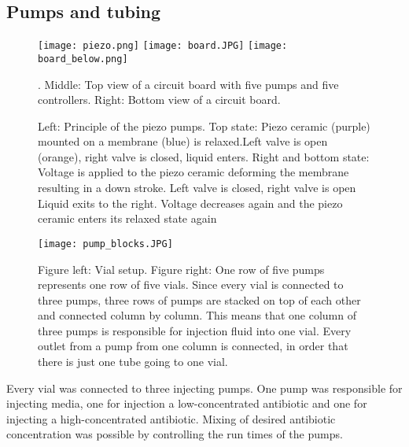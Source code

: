 \subsection{Pumps and tubing} 
\begin{figure}
	\texttt{[image: piezo.png]}
	\texttt{[image: board.JPG]}
	\texttt{[image: board\_below.png]}
	\caption{Left: Principle of the piezo pumps. Top state: Piezo ceramic (purple) mounted on a membrane (blue) is relaxed.Left valve is open (orange), right valve  is closed, liquid enters. Right and bottom state: Voltage is applied to the piezo ceramic deforming the membrane resulting in a down stroke. Left valve is closed, right valve is open Liquid exits to the right. Voltage decreases again and the piezo ceramic enters its relaxed state again \cite{piezo_pumps}}. Middle: Top view of a circuit board with five pumps and five controllers. Right: Bottom view of a circuit board. 
	\label{figure:pumps}
\end{figure}
\begin{figure}
	\texttt{[image: pump\_blocks.JPG]}
	\caption{Figure left: Vial setup. Figure right: One row of five pumps represents one row of five vials. Since every vial is connected to three pumps, three rows of pumps are stacked on top of each other and connected column by column. This means that one column of three pumps is responsible for injection fluid into one vial. Every outlet from a pump from one column is connected, in order that there is just one tube going to one vial. }
	\label{figure:tubing_setup}
\end{figure}
Every vial was connected to three injecting pumps. One pump was responsible for injecting media, one for injection a low-concentrated antibiotic and one for injecting a high-concentrated antibiotic. Mixing of desired antibiotic concentration was possible by controlling the run times of the pumps.
